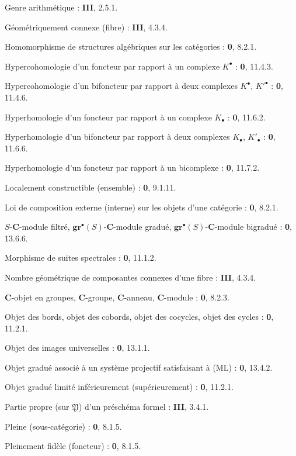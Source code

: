 \begin{flushleft}
Genre arithmétique : \textbf{III}, 2.5.1.

Géométriquement connexe (fibre) : \textbf{III}, 4.3.4.

Homomorphisme de structures algébriques sur les catégories : \textbf{0}, 8.2.1.

Hypercohomologie d'un foncteur par rapport à un complexe $K^\bullet$ :
\textbf{0}, 11.4.3.

Hypercohomologie d'un bifoncteur par rapport à deux complexes
$K^\bullet$, $K'^{\bullet}$ : \textbf{0}, 11.4.6.

Hyperhomologie d'un foncteur par rapport à un complexe $K_\bullet$ :
\textbf{0}, 11.6.2.

Hyperhomologie d'un bifoncteur par rapport à deux complexes $K_\bullet$,
$K'_\bullet$ : \textbf{0}, 11.6.6.

Hyperhomologie d'un foncteur par rapport à un bicomplexe : \textbf{0}, 11.7.2.

Localement constructible (ensemble) : \textbf{0}, 9.1.11.

Loi de composition externe (interne) sur les objets d'une catégorie :
\textbf{0}, 8.2.1.


$S$-$\boldsymbol{C}$-module filtré, $\mathbf{gr}^\bullet(S)$-$\boldsymbol{C}$-module gradué,
$\mathbf{gr}^\bullet(S)$-$\boldsymbol{C}$-module bigradué : \textbf{0}, 13.6.6.

Morphisme de suites spectrales : \textbf{0}, 11.1.2.

Nombre géométrique de composantes connexes d'une fibre : \textbf{III}, 4.3.4.

$\boldsymbol{C}$-objet en groupes, $\boldsymbol{C}$-groupe, $\boldsymbol{C}$-anneau, $\boldsymbol{C}$-module : \textbf{0}, 8.2.3.

Objet des bords, objet des cobords, objet des cocycles, objet des cycles :
\textbf{0}, 11.2.1.

Objet des images universelles : \textbf{0}, 13.1.1.

Objet gradué associé à un système projectif satisfaisant à (ML) : \textbf{0}, 13.4.2.

Objet gradué limité inférieurement (supérieurement) : \textbf{0}, 11.2.1.

Partie propre (sur $\mathfrak Y$) d'un préschéma formel : \textbf{III}, 3.4.1.

Pleine (sous-catégorie) : \textbf{0}, 8.1.5.

Pleinement fidèle (foncteur) : \textbf{0}, 8.1.5.


\end{flushleft}
